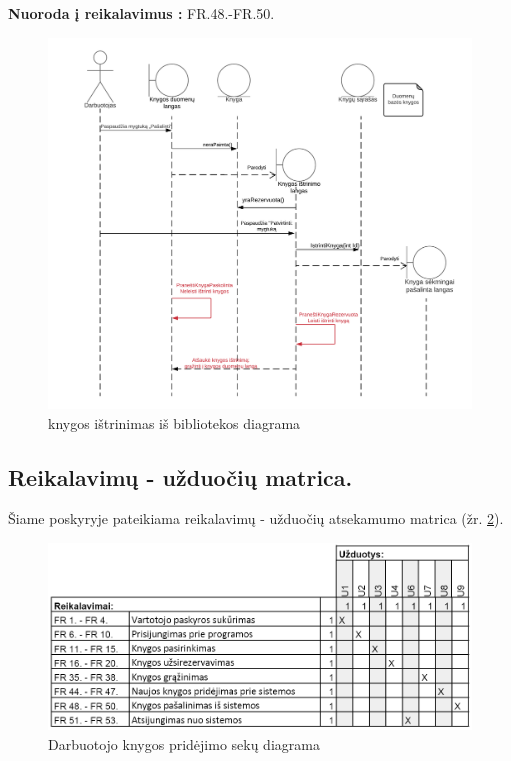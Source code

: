 \documentclass{VUMIFPSkursinis}
\begin{document}
	\textbf {Nuoroda į reikalavimus :} FR.48.-FR.50.
  \begin{figure}[H]
    \label{fig:bookremovediag}
    \centering
    \includegraphics[width=1.05\textwidth]{Sekos_diagramos/istrinti_knyga_seq_diag}
    \caption{knygos ištrinimas iš bibliotekos diagrama}
\end{figure}  
    
\subsection{Reikalavimų - užduočių matrica. }
Šiame poskyryje pateikiama reikalavimų - užduočių atsekamumo matrica (žr. \ref{fig:uzdmatr}).    
    
\begin{figure}[H]
\label{fig:uzdmatr}
    \centering
    \includegraphics[width=1\textwidth]{matricos/uzdmat}
	\caption{Darbuotojo knygos pridėjimo sekų diagrama}
\end{figure}
\end{document}
